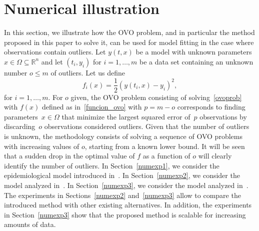 \documentclass[11pt]{article}
\newcommand{\R}{\mathbb{R}}
\begin{document}
\section{Numerical illustration} \label{sec:numexp}

In this section, we illustrate how the OVO problem, and in particular the method proposed in this paper to solve it, can be used for model fitting in the case where observations contain outliers. Let $y(t,x)$ be a model with unknown parameters $x \in \Omega \subseteq \R^n$ and let $(t_i,y_i)$ for $i=1,\dots,m$ be a data set containing an unknown number $o \leq m$ of outliers. Let us define 
\[
f_i(x) = \dfrac{1}{2} \left( y(t_i,x) - y_i \right)^2,
\]
for $i=1,\dots,m$. For $o$ given, the OVO problem consisting of solving~\eqref{ovoprob} with $f(x)$ defined as in~\eqref{funcion_ovo} with $p = m - o$ corresponds to finding parameters~$x \in \Omega$ that minimize the largest squared error of~$p$ observations by discarding~$o$ observations considered outliers. Given that the number of outliers is unknown, the methodology consists of solving a sequence of OVO problems with increasing values of $o$, starting from a known lower bound. It will be seen that a sudden drop in the optimal value of $f$ as a function of $o$ will clearly identify the number of outliers. In Section~\ref{numexp1}, we consider the epidemiological model introduced in~\cite{farrington}. In Section~\ref{numexp2}, we consider the model analyzed in~\cite[\S7.2.1]{yano2}. In Section~\ref{numexp3}, we consider the model analyzed in~\cite[\S4]{dunder1}. The experiments in Sections~\ref{numexp2} and~\ref{numexp3} allow to compare the introduced method with other existing alternatives. In addition, the experiments in Section~\ref{numexp3} show that the proposed method is scalable for increasing amounts of data.
\end{document}
